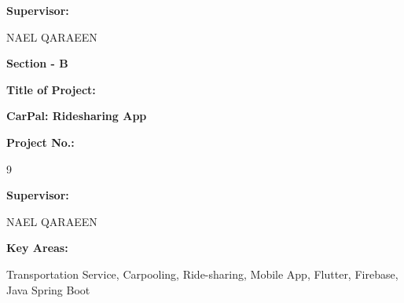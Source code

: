 \documentclass[a4paper, 12pt]{article} %
\begin{document}
\begin{titlepage}
            \vspace{0.8cm}

            \textbf{\large{Supervisor:}}
            \vspace{0.4cm}
            
            \hspace{\parindent} NAEL QARAEEN %

            \pagebreak

            \begin{center}
                \textbf{\large{Section - B}}
                \vspace{0.8cm}
                
                \textbf{\large{Title of Project:}}
                \vspace{0.4cm}
            
                \textbf{\Large{CarPal: Ridesharing App}}
                \vspace{0.8cm}

                \textbf{\large{Project No.:}}
                \vspace{0.4cm}
                
                9
                \vspace{0.8cm}

                \textbf{\large{Supervisor:}}
                \vspace{0.4cm}
            
                NAEL QARAEEN
                \vspace{0.8cm}


                \textbf{\large{Key Areas:}}
                \vspace{0.4cm}

                Transportation Service, Carpooling, Ride-sharing, Mobile App, Flutter, Firebase, Java Spring Boot

            \end{center}
    \end{titlepage}
\end{document}
